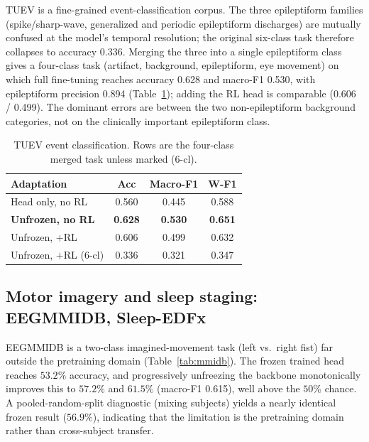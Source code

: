 \documentclass[journal]{IEEEtran}
\newcommand{\best}[1]{\textbf{#1}}
\begin{document}
TUEV is a fine-grained event-classification corpus. The three epileptiform
families (spike/sharp-wave, generalized and periodic epileptiform discharges)
are mutually confused at the model's temporal resolution; the original six-class
task therefore collapses to accuracy \num{0.336}. Merging the three into a single
epileptiform class gives a four-class task (artifact, background,
epileptiform, eye movement) on which full fine-tuning reaches accuracy
\num{0.628} and macro-F1 \num{0.530}, with epileptiform precision \num{0.894}
(Table~\ref{tab:tuev}); adding the RL head is comparable (\num{0.606} /
\num{0.499}). The dominant errors are between the two non-epileptiform background
categories, not on the clinically important epileptiform class.

\begin{table}[t]
\centering
\caption{TUEV event classification. Rows are the four-class merged task unless
marked (6-cl).}
\label{tab:tuev}
\small
\begin{tabular}{@{}lccc@{}}
\toprule
Adaptation & Acc & Macro-F1 & W-F1 \\
\midrule
Head only, no RL              & 0.560 & 0.445 & 0.588 \\
\textbf{Unfrozen, no RL}      & \best{0.628} & \best{0.530} & \best{0.651} \\
Unfrozen, $+$RL               & 0.606 & 0.499 & 0.632 \\
Unfrozen, $+$RL (6-cl)        & 0.336 & 0.321 & 0.347 \\
\bottomrule
\end{tabular}
\end{table}

\subsection{Motor imagery and sleep staging: EEGMMIDB, Sleep-EDFx}
EEGMMIDB is a two-class imagined-movement task (left vs.\ right fist) far outside
the pretraining domain (Table~\ref{tab:mmidb}). The frozen trained head reaches
$53.2\%$ accuracy, and progressively unfreezing the backbone monotonically
improves this to $57.2\%$ and $61.5\%$ (macro-F1 \num{0.615}), well above the
$50\%$ chance. A pooled-random-split diagnostic (mixing subjects) yields a nearly
identical frozen result ($56.9\%$), indicating that the limitation is the
pretraining domain rather than cross-subject transfer.
\end{document}
